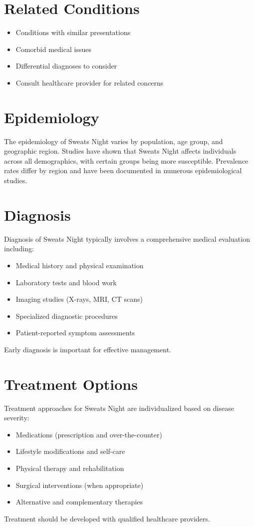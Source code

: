 \section*{Related Conditions}
\begin{itemize}
  \item Conditions with similar presentations
  \item Comorbid medical issues
  \item Differential diagnoses to consider
  \item Consult healthcare provider for related concerns
\end{itemize}

\section*{Epidemiology}
The epidemiology of Sweats Night varies by population, age group, and geographic region. Studies have shown that Sweats Night affects individuals across all demographics, with certain groups being more susceptible. Prevalence rates differ by region and have been documented in numerous epidemiological studies.

\section*{Diagnosis}
Diagnosis of Sweats Night typically involves a comprehensive medical evaluation including:
\begin{itemize}
  \item Medical history and physical examination
  \item Laboratory tests and blood work
  \item Imaging studies (X-rays, MRI, CT scans)
  \item Specialized diagnostic procedures
  \item Patient-reported symptom assessments
\end{itemize}
Early diagnosis is important for effective management.

\section*{Treatment Options}
Treatment approaches for Sweats Night are individualized based on disease severity:
\begin{itemize}
  \item Medications (prescription and over-the-counter)
  \item Lifestyle modifications and self-care
  \item Physical therapy and rehabilitation
  \item Surgical interventions (when appropriate)
  \item Alternative and complementary therapies
\end{itemize}
Treatment should be developed with qualified healthcare providers.

